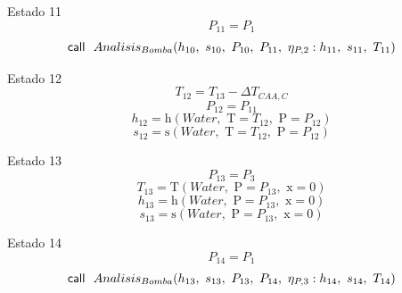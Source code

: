 \documentclass[10pt,fleqn]{article}
\theoremstyle{mytheoremstyle}
\theoremstyle{mytheoremstyle}
\theoremstyle{myproblemstyle}
\newcommand{\F}[1]{\mbox{$#1$}}
\newcommand{\K}[1]{\mbox{\sf#1\ \ \mit}}
\newcommand{\temperature}{\mathrm{T}}
\newcommand{\enthalpy}{\mathrm{h}}
\newcommand{\entropy}{\mathrm{s}}
\begin{document}
\vspace{0.10in}
\noindent
{\color{blue} \rm Estado 11}
\begin{equation}
\label{EES Eqn:60}
P_{11}=P_{1} 
\end{equation}
\begin{equation}
\label{EES Eqn:61}
\K{call} \F{Analisis_{Bomba}}{ \left( h_{10},\ s_{10},\ P_{10},\ P_{11},\ \eta_{P,2}:h_{11},\ s_{11},\ T_{11} \right) } 
\end{equation}

\vspace{0.10in}
\noindent
{\color{blue} \rm Estado 12}
\begin{equation}
\label{EES Eqn:62}
T_{12}=T_{13}-{\Delta T}_{CAA,C} 
\end{equation}
\begin{equation}
\label{EES Eqn:63}
P_{12}=P_{11} 
\end{equation}
\begin{equation}
\label{EES Eqn:64}
h_{12}=\enthalpy \left(\F{Water},\mbox{\ T}=T_{12},\mbox{\ P}=P_{12} \right)  
\end{equation}
\begin{equation}
\label{EES Eqn:65}
s_{12}=\entropy \left(\F{Water},\mbox{\ T}=T_{12},\mbox{\ P}=P_{12} \right)  
\end{equation}

\vspace{0.10in}
\noindent
{\color{blue} \rm Estado 13}
\begin{equation}
\label{EES Eqn:66}
P_{13}=P_{3} 
\end{equation}
\begin{equation}
\label{EES Eqn:67}
T_{13}=\temperature \left(\F{Water},\mbox{\ P}=P_{13},\mbox{\ x}=0 \right)  
\end{equation}
\begin{equation}
\label{EES Eqn:68}
h_{13}=\enthalpy \left(\F{Water},\mbox{\ P}=P_{13},\mbox{\ x}=0 \right)  
\end{equation}
\begin{equation}
\label{EES Eqn:69}
s_{13}=\entropy \left(\F{Water},\mbox{\ P}=P_{13},\mbox{\ x}=0 \right)  
\end{equation}

\vspace{0.10in}
\noindent
{\color{blue} \rm Estado 14}
\begin{equation}
\label{EES Eqn:70}
P_{14}=P_{1} 
\end{equation}
\begin{equation}
\label{EES Eqn:71}
\K{call} \F{Analisis_{Bomba}}{ \left( h_{13},\ s_{13},\ P_{13},\ P_{14},\ \eta_{P,3}:h_{14},\ s_{14},\ T_{14} \right) } 
\end{equation}
\end{document}
